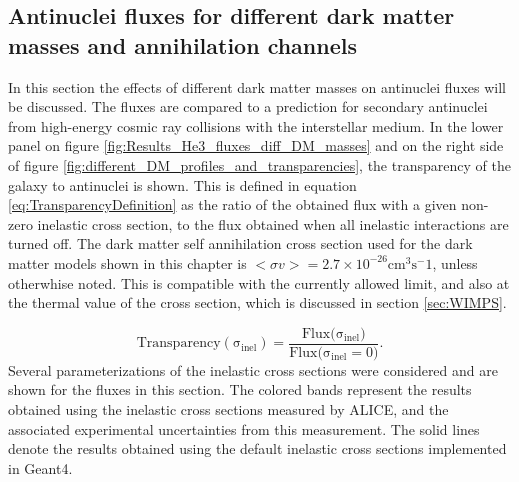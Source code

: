 \subsection{Antinuclei fluxes for different dark matter masses and annihilation channels}
In this section the effects of different dark matter masses on antinuclei fluxes will be discussed. The fluxes are compared to a prediction for secondary antinuclei from high-energy cosmic ray collisions with the interstellar medium. In the lower panel on figure \ref{fig:Results_He3_fluxes_diff_DM_masses} and  on the right side of figure \ref{fig:different_DM_profiles_and_transparencies}, the transparency of the galaxy to antinuclei is shown. This is defined in equation \ref{eq:TransparencyDefinition} as the ratio of the obtained flux with a given non-zero inelastic cross section, to the flux obtained when all inelastic interactions are turned off. The dark matter self annihilation cross section used for the dark matter models shown in this chapter is $<\sigma v>=2.7 \times 10^{-26}$cm$^3 \mathrm{s}^-1$, unless otherwhise noted. This is compatible with the currently allowed limit, and also at the thermal value of the cross section, which is discussed in section \ref{sec:WIMPS}. 

\begin{equation}\label{eq:TransparencyDefinition}
    \mathrm{Transparency(\sigma_{inel})} = \frac{\mathrm{Flux(\sigma_{inel}})}{\mathrm{Flux(\sigma_{inel}=0})} .
\end{equation}
Several parameterizations of the inelastic cross sections were considered and are shown for the fluxes in this section. The colored bands represent the results obtained using the inelastic cross sections measured by ALICE, and the associated experimental uncertainties from this measurement. The solid lines denote the results obtained using the default inelastic cross sections implemented in Geant4. 

